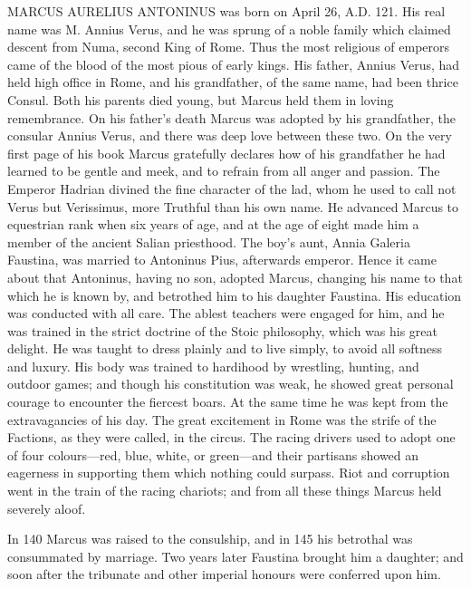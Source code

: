 
MARCUS AURELIUS ANTONINUS was born on April 26, A.D. 121. His real name was M.
Annius Verus, and he was sprung of a noble family which claimed descent from
Numa, second King of Rome. Thus the most religious of emperors came of the
blood of the most pious of early kings. His father, Annius Verus, had held high
office in Rome, and his grandfather, of the same name, had been thrice Consul.
Both his parents died young, but Marcus held them in loving remembrance. On his
father's death Marcus was adopted by his grandfather, the consular Annius
Verus, and there was deep love between these two. On the very first page of his
book Marcus gratefully declares how of his grandfather he had learned to be
gentle and meek, and to refrain from all anger and passion. The Emperor Hadrian
divined the fine character of the lad, whom he used to call not Verus but
Verissimus, more Truthful than his own name. He advanced Marcus to equestrian
rank when six years of age, and at the age of eight made him a member of the
ancient Salian priesthood. The boy's aunt, Annia Galeria Faustina, was married
to Antoninus Pius, afterwards emperor. Hence it came about that Antoninus,
having no son, adopted Marcus, changing his name to that which he is known by,
and betrothed him to his daughter Faustina. His education was conducted with
all care. The ablest teachers were engaged for him, and he was trained in the
strict doctrine of the Stoic philosophy, which was his great delight. He was
taught to dress plainly and to live simply, to avoid all softness and luxury.
His body was trained to hardihood by wrestling, hunting, and outdoor games; and
though his constitution was weak, he showed great personal courage to encounter
the fiercest boars. At the same time he was kept from the extravagancies of his
day. The great excitement in Rome was the strife of the Factions, as they were
called, in the circus. The racing drivers used to adopt one of four
colours—red, blue, white, or green—and their partisans showed an
eagerness in supporting them which nothing could surpass. Riot and corruption
went in the train of the racing chariots; and from all these things Marcus held
severely aloof.

In 140 Marcus was raised to the consulship, and in 145 his betrothal was
consummated by marriage. Two years later Faustina brought him a daughter; and
soon after the tribunate and other imperial honours were conferred upon him.

